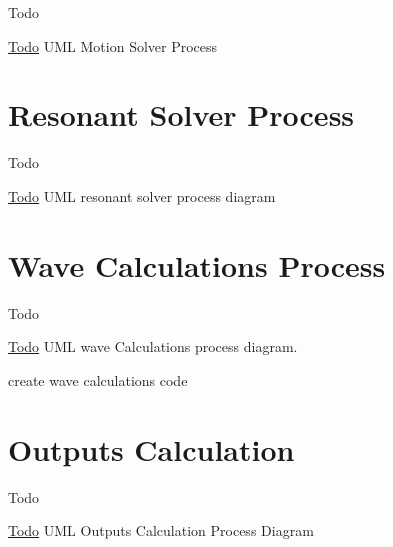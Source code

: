 \begin{DoxyRefDesc}{Todo}
\item[\hyperlink{todo__todo000003}{Todo}]U\-M\-L Motion Solver Process\end{DoxyRefDesc}
\hypertarget{UML_ResonantSolver}{}\section{Resonant Solver Process}\label{UML_ResonantSolver}
\begin{DoxyRefDesc}{Todo}
\item[\hyperlink{todo__todo000006}{Todo}]U\-M\-L resonant solver process diagram\end{DoxyRefDesc}
\hypertarget{UML_WaveCalculation}{}\section{Wave Calculations Process}\label{UML_WaveCalculation}
\begin{DoxyRefDesc}{Todo}
\item[\hyperlink{todo__todo000007}{Todo}]U\-M\-L wave Calculations process diagram. 

create wave calculations code\end{DoxyRefDesc}
\hypertarget{UML_OutputsCalculation}{}\section{Outputs Calculation}\label{UML_OutputsCalculation}
\begin{DoxyRefDesc}{Todo}
\item[\hyperlink{todo__todo000004}{Todo}]U\-M\-L Outputs Calculation Process Diagram\end{DoxyRefDesc}
